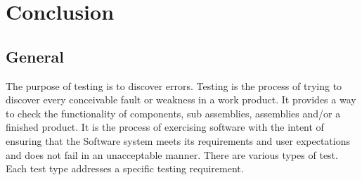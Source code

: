 \chapter{Conclusion}

\section{General}
The purpose of testing is to discover errors. Testing is the process of trying to discover every conceivable fault or weakness in a work product. It provides a way to check the functionality of components, sub assemblies, assemblies and/or a finished product. It is the process of exercising software with the intent of ensuring that the Software system meets its requirements and user expectations and does not fail in an unacceptable manner. There are various types of test. Each test type addresses a specific testing requirement.